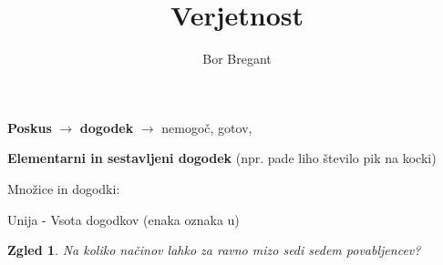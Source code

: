 \documentclass{article}
\title{Verjetnost}
\author{Bor Bregant}
\date{\vspace{-5ex}}
\newtheorem*{zgled}{Zgled}
\begin{document}
\maketitle

\textbf{Poskus} $\rightarrow$ \textbf{dogodek} $\rightarrow$ nemogoč, gotov, 

\textbf{Elementarni in sestavljeni dogodek} (npr. pade liho število pik na kocki)

Množice in dogodki:

Unija - Vsota dogodkov (enaka oznaka u)

\begin{zgled}
    Na koliko načinov lahko za ravno mizo sedi sedem povabljencev?
\end{zgled}
\end{document}
